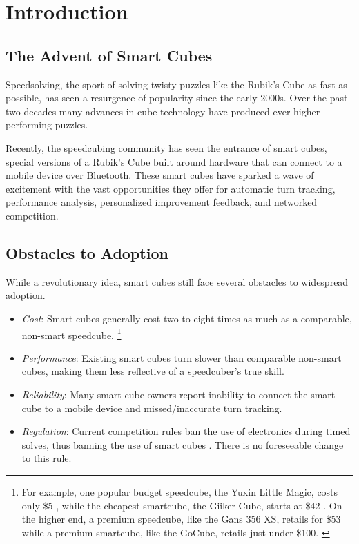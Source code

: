 \chapter{Introduction} 
\label{Chapter1}


\section{The Advent of Smart Cubes}

Speedsolving, the sport of solving twisty puzzles like the Rubik's Cube
as fast as possible, has seen a resurgence of popularity since the
early 2000s. \cite{wca-competition-history} Over the past two decades
many advances in cube technology have produced ever higher performing
puzzles.

Recently, the speedcubing community has seen the entrance of smart
cubes, special versions of a Rubik's Cube built around hardware that
can connect to a mobile device over Bluetooth. These smart cubes have
sparked a wave of excitement with the vast opportunities they offer for
automatic turn tracking, performance analysis, personalized improvement
feedback, and networked competition.


\section{Obstacles to Adoption}

While a revolutionary idea, smart cubes still face several obstacles to
widespread adoption.

\begin{itemize}

    \item \emph{Cost}: Smart cubes generally cost two to eight times as
    much as a comparable, non-smart speedcube. \footnote{For example,
    one popular budget speedcube, the Yuxin Little Magic, costs only
    \$5 \cite{yuxin-thecubicle}, while the cheapest smartcube, the
    Giiker Cube, starts at \$42 \cite{giiker-thecubicle}. On the higher
    end, a premium speedcube, like the Gans 356 XS, retails for \$53
    \cite{gans-xs-thecubicle} while a premium smartcube, like the
    GoCube, retails just under \$100. \cite{gocube-price}}
    
    \item \emph{Performance}: Existing smart cubes turn slower than
    comparable non-smart cubes, making them less reflective of a
    speedcuber's true skill. \cite{smartcube-regulation-discussion}
    
    \item \emph{Reliability}: Many smart cube owners report inability
    to connect the smart cube to a mobile device and missed/inaccurate
    turn tracking. \cite{smartcube-regulation-discussion}
    
    \item \emph{Regulation}: Current competition rules ban the use of
    electronics during timed solves, thus banning the use of smart
    cubes \cite{wca-regulations}. There is no foreseeable change to
    this rule. \cite{smartcube-regulation-discussion}
    
\end{itemize}

